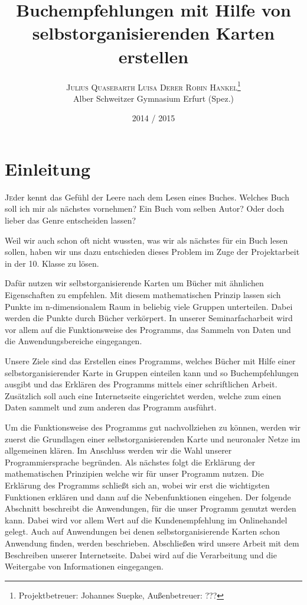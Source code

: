 \documentclass[twoside,a4paper]{article}
\title{\vspace{-15mm}\fontsize{24pt}{10pt}\selectfont\bfseries{}Buchempfehlungen mit Hilfe von selbstorganisierenden Karten erstellen}
\author{\large\textsc{Julius Quasebarth \quad Luisa Derer \quad Robin Hankel}\thanks{Projektbetreuer: Johannes Suepke, Außenbetreuer: ???}\\[2mm]\normalsize Alber Schweitzer Gymnasium Erfurt (Spez.)\\\vspace{-5mm}}
\date{2014 / 2015}
\newcommand{\commonlettrine}[1]{\lettrine[nindent=0em,lines=2]{#1}}
\begin{document}
\maketitle

\thispagestyle{fancy}


\tableofcontents

\section{Einleitung}

\commonlettrine{J}eder kennt das Gefühl der Leere nach dem Lesen eines Buches. Welches Buch soll ich mir als nächstes vornehmen? Ein Buch vom selben Autor? Oder doch lieber das Genre entscheiden lassen?

Weil wir auch schon oft nicht wussten, was wir als nächstes für ein Buch lesen sollen, haben wir uns dazu entschieden dieses Problem im Zuge der Projektarbeit in der 10. Klasse zu lösen.

Dafür nutzen wir selbstorganisierende Karten um Bücher mit ähnlichen Eigenschaften zu empfehlen. Mit diesem mathematischen Prinzip lassen sich Punkte im n-dimensionalem Raum in beliebig viele Gruppen unterteilen. Dabei werden die Punkte durch Bücher verkörpert. In unserer Seminarfacharbeit wird vor allem auf die Funktionsweise des Programms, das Sammeln von Daten und die Anwendungsbereiche eingegangen.

Unsere Ziele sind das Erstellen eines Programms, welches Bücher mit Hilfe einer selbstorganisierender Karte in Gruppen einteilen kann und so Buchempfehlungen ausgibt und das Erklären des Programms mittels einer schriftlichen Arbeit. Zusätzlich soll auch eine Internetseite eingerichtet werden, welche zum einen Daten sammelt und zum anderen das Programm ausführt.

Um die Funktionsweise des Programms gut nachvollziehen zu können, werden wir zuerst die Grundlagen einer selbstorganisierenden Karte und neuronaler Netze im allgemeinen klären. Im Anschluss werden wir die Wahl unserer Programmiersprache begründen. Als nächstes folgt die Erklärung der mathematischen Prinzipien welche wir für unser Programm nutzen. Die Erklärung des Programms schließt sich an, wobei wir erst die wichtigsten Funktionen erklären und dann auf die Nebenfunktionen eingehen. Der folgende Abschnitt beschreibt die Anwendungen, für die unser Programm genutzt werden kann. Dabei wird vor allem Wert auf die Kundenempfehlung im Onlinehandel gelegt. Auch auf Anwendungen bei denen selbstorganisierende Karten schon Anwendung finden, werden beschrieben. Abschließen wird unsere Arbeit mit dem Beschreiben unserer Internetseite. Dabei wird auf die Verarbeitung und die Weitergabe von Informationen eingegangen.
\end{document}
